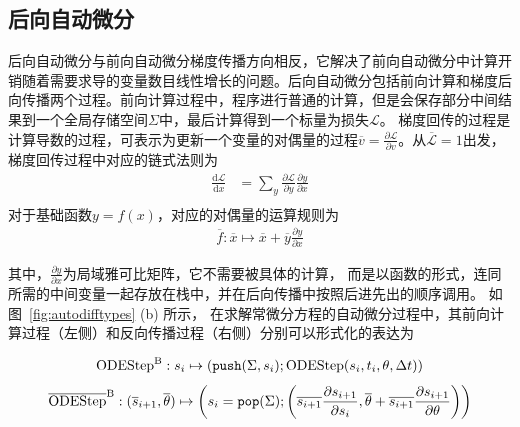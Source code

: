 \documentclass[A4,twoside,fontset=ubuntu,UTF8]{ctexart}
\def\D{\mathrm{d}}
\begin{document}
\subsection{后向自动微分}
后向自动微分与前向自动微分梯度传播方向相反，它解决了前向自动微分中计算开销随着需要求导的变量数目线性增长的问题。后向自动微分包括前向计算和梯度后向传播两个过程。前向计算过程中，程序进行普通的计算，但是会保存部分中间结果到一个全局存储空间$\Sigma$中，最后计算得到一个标量为损失$\mathcal{L}$。
梯度回传的过程是计算导数的过程，可表示为更新一个变量的对偶量的过程$\overline{v} = \frac{\partial \mathcal{L}}{\partial v}$。从$\overline{\mathcal L} = 1$出发，
梯度回传过程中对应的链式法则为
\begin{align*}
    \frac{\D \mathcal{L}}{\D x} &= \sum_y\frac{\partial \mathcal{L}}{\partial y}\frac{\partial y}{\partial x}\\
\end{align*}
对于基础函数$y=f(x)$，对应的对偶量的运算规则为
\begin{align*}
    \overline f: \overline x \mapsto \overline x + \overline y\frac{\partial y}{\partial x}
\end{align*}

其中，$\frac{\partial y}{\partial x}$为局域雅可比矩阵，它不需要被具体的计算，
而是以函数的形式，连同所需的中间变量一起存放在栈中，并在后向传播中按照后进先出的顺序调用。
如图~\ref{fig:autodifftypes} (b) 所示，
在求解常微分方程的自动微分过程中，其前向计算过程（左侧）和反向传播过程（右侧）分别可以形式化的表达为

\begin{align*}
    {\rm ODEStep}^{\rm B} : s_{i} \mapsto
    \left(\texttt{push}(\Sigma, s_{i});
    {\rm ODEStep}(s_{i}, t_i, \theta, \Delta t)\right)
\end{align*}
\begin{align*}
    \overline{\rm ODEStep}^{\rm B} : (\overline s_{i+1}, \overline\theta) \mapsto \left(s_{i} = \texttt{pop}(\Sigma);
    \left(\overline{s_{i+1}}\frac{\partial s_{i+1}}{\partial s_{i}}
    ,\overline{\theta} + \overline{s_{i+1}}\frac{\partial s_{i+1}}{\partial \theta}\right)\right)
\end{align*}
\end{document}
